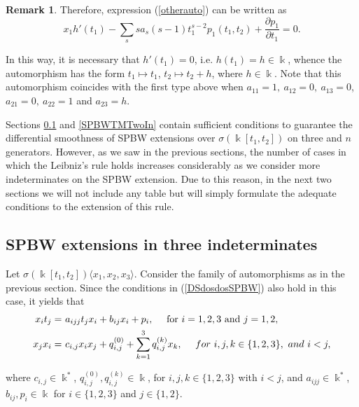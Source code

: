 \documentclass{amsart}
\theoremstyle{definition}
\newtheorem{remark}[theorem]{Remark}
\theoremstyle{remark}
\numberwithin{equation}{section}
\begin{document}
\begin{remark}
Therefore, expression {\rm (}\ref{otherauto}{\rm )} can be written as
\begin{equation*}
    x_1h'(t_1)-\sum_{s}sa_s(s-1)t_1^{s-2}p_1(t_1,t_2)+\frac{\partial p_1}{\partial t_1}=0.
\end{equation*}

In this way, it is necessary that $h'(t_1)=0$, i.e. $h(t_1)=h\in\Bbbk$, whence the automorphism has the form $t_1 \longmapsto t_1$, $t_2 \longmapsto t_2+h$, where $h\in\Bbbk$. Note that this automorphism coincides with the first type above when $a_{11} = 1,\ a_{12}=0, \ a_{13}=0$, $a_{21}=0, \ a_{22} = 1$ and $a_{23} = h$.
\end{remark}

Sections \ref{SPBWTMTwoI3} and \ref{SPBWTMTwoIn} contain sufficient conditions to guarantee the differential smoothness of SPBW extensions over $\sigma(\Bbbk[t_1, t_2])$ on three and $n$ generators. However, as we saw in the previous sections, the number of cases in which the Leibniz's rule holds increases considerably as we consider more indeterminates on the SPBW extension. Due to this reason, in the next two sections we will not include any table but will simply formulate the adequate conditions to the extension of this rule.


\subsection{SPBW extensions in three indeterminates}\label{SPBWTMTwoI3}

Let $\sigma(\Bbbk[t_1, t_2]) \langle x_1, x_2, x_3\rangle$. Consider the family of automorphisms as in the previous section. Since the conditions in {\rm (}\ref{DSdosdosSPBW}{\rm )} also hold in this case, it yields that
\begin{align}
    x_it_j = &\  a_{ijj}t_jx_i+b_{ij}x_i+ p_i, \quad \text{ for } i=1, 2, 3 \text{ and } j=1, 2, \label{DSdostresSPBW11} \\
    x_j x_i = &\ c_{i, j}x_i x_j + q_{i,j}^{(0)} + \sum_{k=1}^{3}q_{i,j}^{(k)}x_k, \quad\ {\rm for}\ i, j, k \in \{1, 2, 3\}, \ {\rm and} \ i < j, \label{DSdostresSPBW1}
\end{align}

where $c_{i,j}\in\Bbbk^{\ast}$, $q_{i,j}^{(0)}, q_{i,j}^{(k)}\in \Bbbk$,  for $i, j, k \in \{1, 2, 3\}$ with $i < j$, and $ a_{ijj}\in\Bbbk^{\ast}$, $b_{ij}, p_i \in\Bbbk$ for $i\in \{1, 2, 3\}$ and $j\in \{1,2 \}$.
\end{document}
